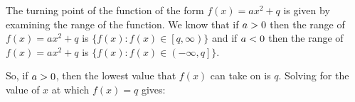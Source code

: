         \label{m39345*uid121}
            \nopagebreak
            
          
          \label{m39345*id243854}The turning point of the function of the form \begin{math}f\left(x\right)=a{x}^{2}+q\end{math} is given by examining the range of the function. We know that if \begin{math}a>{}0\end{math} then the range of \begin{math}f\left(x\right)=a{x}^{2}+q\end{math} is \begin{math}\{f\left(x\right):f\left(x\right)\in \left[q,\infty \right)\}\end{math} and if \begin{math}a<{}0\end{math} then the range of \begin{math}f\left(x\right)=a{x}^{2}+q\end{math} is \begin{math}\{f\left(x\right):f\left(x\right)\in \left(-\infty ,q\right]\}\end{math}.\par 
          \label{m39345*id244081}So, if \begin{math}a>{}0\end{math}, then the lowest value that \begin{math}f\left(x\right)\end{math} can take on is \begin{math}q\end{math}. Solving for the value of \begin{math}x\end{math} at which \begin{math}f\left(x\right)=q\end{math} gives:\par 
          \label{m39345*id244157}\nopagebreak\noindent{}
